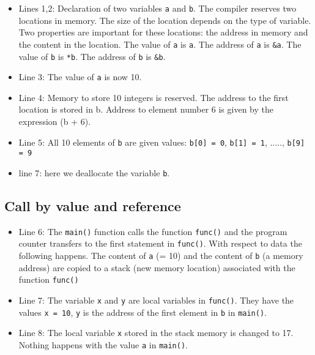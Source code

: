 \documentclass[%
oneside,                 %
final,                   %
10pt]{article}
\begin{document}
{{{{{\begin{itemize}
  \item Lines 1,2: Declaration of two variables \Verb!a! and \Verb!b!. The compiler reserves two locations in memory. The size of the location depends on the type of variable. Two properties are important for these locations: the address in memory and the content in the location. The value of \Verb!a! is \Verb!a!. The address of \Verb!a! is \Verb!&a!. The value of \Verb!b! is \Verb!*b!. The address of \Verb!b! is \Verb!&b!.

  \item Line 3: The value of \Verb!a! is now 10.

  \item Line 4: Memory to store 10 integers is reserved. The address to the first location is stored in b. Address to element number 6 is given by the expression (b + 6).

  \item Line 5: All 10 elements of \Verb!b! are given values: \Verb!b[0] = 0!, \Verb!b[1] = 1!, ....., \Verb!b[9] = 9!

  \item line 7: here we deallocate the variable \Verb!b!.
\end{itemize}

\noindent
\subsection{Call by value and reference}

\begin{itemize}
  \item Line 6: The \Verb!main()! function calls the function \Verb!func()! and the program counter transfers to the first statement in \Verb!func()!. With respect to data the following happens. The content of \Verb!a! (= 10) and the content of \Verb!b! (a memory address) are copied to a stack (new memory location) associated with the function \Verb!func()!

  \item Line 7: The variable \Verb!x! and \Verb!y! are local variables in \Verb!func()!. They have the values  \Verb!x = 10!, \Verb!y! is the address of the first element in \Verb!b! in \Verb!main()!.

  \item Line 8: The local variable \Verb!x! stored in the stack memory is changed to 17. Nothing happens with the value \Verb!a! in \Verb!main()!.
\end{itemize}

}}}}}
\end{document}
